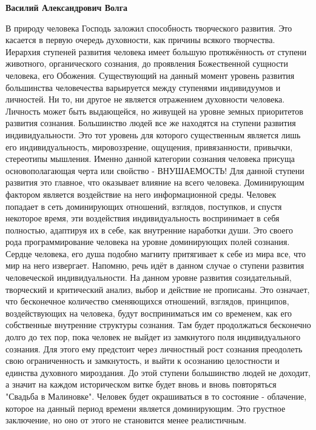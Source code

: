 \begin{itemize}
\begin{itemize}

\textbf{Василий Александрович Волга} 

В природу человека Господь заложил способность творческого развития. Это
касается в первую очередь духовности, как причины всякого творчества. Иерархия
ступеней развития человека имеет большую протяжённость от ступени животного,
органического сознания, до проявления Божественной сущности человека, его
Обожения. Существующий на данный момент уровень развития большинства
человечества варьируется между ступенями индивидуумов и личностей. Ни то, ни
другое не является отражением духовности человека. Личность может быть
выдающейся, но живущей на уровне земных приоритетов развития сознания.
Большинство людей все же находятся на ступени развития индивидуальности. Это
тот уровень для которого существенным является лишь его индивидуальность,
мировоззрение, ощущения, привязанности, привычки, стереотипы мышления. Именно
данной категории сознания человека присуща основополагающая черта или свойство
- ВНУШАЕМОСТЬ! Для данной ступени развития это главное, что оказывает влияние
на всего человека. Доминирующим фактором является воздействие на него
информационной среды. Человек попадает в сеть доминирующих отношений, взглядов,
поступков, и спустя некоторое время, эти воздействия индивидуальность
воспринимает в себя полностью, адаптируя их в себе, как внутренние наработки
души. Это своего рода программирование человека на уровне доминирующих полей
сознания. Сердце человека, его душа подобно магниту притягивает к себе из мира
все, что мир на него извергает. Напомню, речь идёт в данном случае о ступени
развития человеческой индивидуальности. На данном уровне развития
созидательный, творческий и критический анализ, выбор и действие не прописаны.
Это означает, что бесконечное количество сменяющихся отношений, взглядов,
принципов, воздействующих на человека, будут восприниматься им со временем, как
его собственные внутренние структуры сознания. Там будет продолжаться
бесконечно долго до тех пор, пока человек не выйдет из замкнутого поля
индивидуального сознания. Для этого ему предстоит через личностный рост
сознания преодолеть свою ограниченность и замкнутость, и выйти к осознанию
целостности и единства духовного мироздания. До этой ступени большинство людей
не доходит, а значит на каждом историческом витке будет вновь и вновь
повторяться "Свадьба в Малиновке". Человек будет окрашиваться в то состояние -
облачение, которое на данный период времени является доминирующим. Это грустное
заключение, но оно от этого не становится менее реалистичным.


\end{itemize}
\end{itemize}
